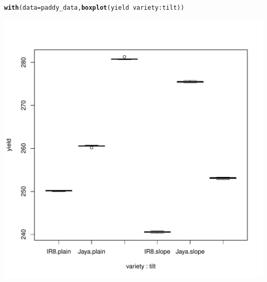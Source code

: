 \documentclass[11pt, a4paper]{article}\usepackage[]{graphicx}\usepackage[dvipsnames]{xcolor}
\makeatletter
\def\maxwidth{ %
  \ifdim\Gin@nat@width>\linewidth
    \linewidth
  \else
    \Gin@nat@width
  \fi
}
\newcommand{\hlopt}[1]{\textcolor[rgb]{0,0,0}{#1}}%
\newcommand{\hlstd}[1]{\textcolor[rgb]{0.345,0.345,0.345}{#1}}%
\newcommand{\hlkwc}[1]{\textcolor[rgb]{0.333,0.667,0.333}{#1}}%
\newcommand{\hlkwd}[1]{\textcolor[rgb]{0.737,0.353,0.396}{\textbf{#1}}}%
\newenvironment{kframe}{%
 \def\at@end@of@kframe{}%
 \ifinner\ifhmode%
  \def\at@end@of@kframe{\end{minipage}}%
  \begin{minipage}{\columnwidth}%
 \fi\fi%
 \def\FrameCommand##1{\hskip\@totalleftmargin \hskip-\fboxsep
 \colorbox{shadecolor}{##1}\hskip-\fboxsep
     \hskip-\linewidth \hskip-\@totalleftmargin \hskip\columnwidth}%
 \MakeFramed {\advance\hsize-\width
   \@totalleftmargin\z@ \linewidth\hsize
   \@setminipage}}%
 {\par\unskip\endMakeFramed%
 \at@end@of@kframe}
\newenvironment{knitrout}{}{} %
\makeatother
\begin{document}
\newpage

\begin{knitrout}
\color{fgcolor}\begin{kframe}
\begin{alltt}
\hlkwd{with}\hlstd{(}\hlkwc{data} \hlstd{= paddy_data,} \hlkwd{boxplot}\hlstd{(yield} \hlopt{~} \hlstd{variety}\hlopt{:}\hlstd{tilt))}
\end{alltt}
\end{kframe}
\includegraphics[width=\maxwidth]{figure/unnamed-chunk-16-1} 
\end{knitrout}

\newpage
\end{document}
